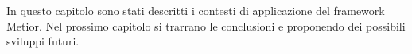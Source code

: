 In questo capitolo sono stati descritti i contesti di applicazione del framework Metior.
Nel prossimo capitolo si trarrano le conclusioni e proponendo dei possibili sviluppi futuri.
